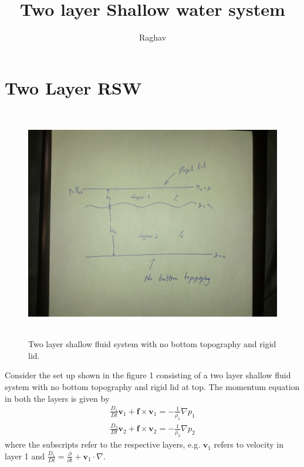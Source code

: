 \documentclass[12pt,twoside]{article}
\title{Two layer Shallow water system}
\author{Raghav}
\newcommand\p{\ensuremath{\partial}}
\newcommand{\bs}  [1]{\boldsymbol{#1}}
\newcommand{\del} {\nabla}
\newcommand{\pp} [2]{\frac{\p{#1}}{\p{#2}}}
\begin{document}
\maketitle

\section*{Two Layer RSW}



\begin{figure}
\centering
\includegraphics[width=5in,height=4in]{2_layer_sw.jpg}
\caption{Two layer shallow fluid system with no bottom topography and rigid lid.}
\label{sw2}
\end{figure}

Consider the set up shown in the figure 1 consisting of a two layer  shallow fluid system with no bottom topography and rigid lid at top. The momentum equation in both the layers is given by
\begin{subequations}
\label{mom}
\begin{align}
\frac{D_1 }{D t} \bs v_1 + \bs f \times \bs v_1 = -\frac{1}{\rho _1} \del p_1  \\
\frac{D_2 }{D t} \bs v_2 + \bs f \times \bs v_2 = -\frac{1}{\rho _2} \del p_2
\end{align}
\end{subequations}
where the subscripts refer to the respective layers, e.g. $\bs v_1$ refers to velocity in layer 1 and $\frac{D_1 }{D t} = \pp{}{t} + \bs v_1 \cdot \del$.
\end{document}
